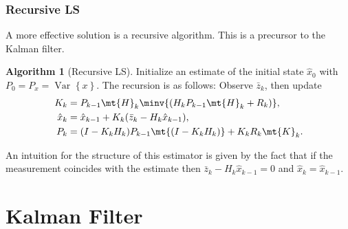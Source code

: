 \documentclass[margin=small]{hsrzf}
\makeatletter
\DeclareMathOperator*{\ost@variance}{Var}
\newcommand*{\Var}[2][]{\ost@variance_{#1}\left\{#2\right\}}
\theoremstyle{plain}
\theoremstyle{definition}
\newtheorem{alg}{Algorithm}[section]
\theoremstyle{remark}
\makeatother
\begin{document}
\subsubsection{Recursive LS}

A more effective solution is a recursive algorithm. This is a precursor to the
Kalman filter.

\begin{alg}[Recursive LS]
  Initialize an estimate of the initial state $\hat{x}_0$ with $P_0
  = P_x = \Var{x}$. The recursion is as follows:
  Observe $\bar{z}_k$, then update
  \begin{align*}
    K_k &= P_{k-1} \mt{H}_k \minv{(H_k P_{k-1}\mt{H}_k + R_k)}, \\
    \hat{x}_k &= \hat{x}_{k-1} + K_k (\bar{z}_k - H_k \hat{x}_{k-1}), \\
    P_k &= (I - K_k H_k) P_{k-1} \mt{(I - K_k H_k)} + K_k R_k \mt{K}_k.
  \end{align*}
\end{alg}

An intuition for the structure of this estimator is given by the fact that if
the measurement coincides with the estimate then $\bar{z}_k - H_k \hat{x}_{k-1}
= 0$ and $\hat{x}_k = \hat{x}_{k-1}$.

\section{Kalman Filter}
\end{document}
